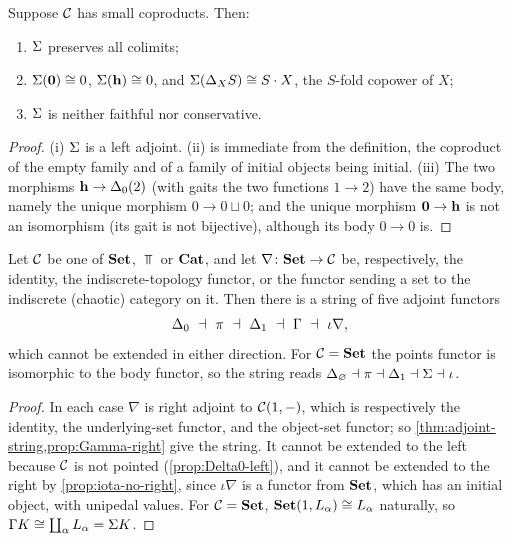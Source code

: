\begin{proposition}\label{prop:body-properties}
Suppose $\mathcal{C}$ has small coproducts. Then:
\begin{enumerate}
\item $\Sigma$ preserves all colimits;
\item $\Sigma(\mathbf{0})\cong0$, $\Sigma(\mathbf{h})\cong0$, and
  $\Sigma(\Delta_XS)\cong S\cdot X$, the $S$-fold copower of $X$;
\item $\Sigma$ is neither faithful nor conservative.
\end{enumerate}
\end{proposition}

\begin{proof}
(i) $\Sigma$ is a left adjoint. (ii) is immediate from the definition, the
coproduct of the empty family and of a family of initial objects being
initial. (iii) The two morphisms $\mathbf{h}\to\Delta_0(2)$ (with gaits the two
functions $1\to2$) have the same body, namely the unique morphism
$0\to0\sqcup0$; and the unique morphism $\mathbf{0}\to\mathbf{h}$ is not an
isomorphism (its gait is not bijective), although its body $0\to0$ is.
\end{proof}

\begin{proposition}\label{prop:set-string}
Let $\mathcal{C}$ be one of $\mathbf{Set}$, $\Top$ or $\mathbf{Cat}$, and let $\nabla\colon\mathbf{Set}\to\mathcal{C}$
be, respectively, the identity, the indiscrete-topology functor, or the
functor sending a set to the indiscrete (chaotic) category on it. Then there
is a string of five adjoint functors
\[
\Delta_0\ \dashv\ \legs\ \dashv\ \Delta_1\ \dashv\ \points\ \dashv\ \iota\nabla,
\]
which cannot be extended in either direction. For $\mathcal{C}=\mathbf{Set}$ the points functor
is isomorphic to the body functor, so the string reads
$\Delta_\varnothing\dashv\pi\dashv\Delta_1\dashv\Sigma\dashv\iota$.
\end{proposition}

\begin{proof}
In each case $\nabla$ is right adjoint to $\mathcal{C}(1,-)$, which is respectively
the identity, the underlying-set functor, and the object-set functor; so
\cref{thm:adjoint-string,prop:Gamma-right} give the string. It cannot be
extended to the left because $\mathcal{C}$ is not pointed (\cref{prop:Delta0-left}),
and it cannot be extended to the right by \cref{prop:iota-no-right}, since
$\iota\nabla$ is a functor from $\mathbf{Set}$, which has an initial object, with
unipedal values. For $\mathcal{C}=\mathbf{Set}$, $\mathbf{Set}(1,L_\alpha)\cong L_\alpha$ naturally,
so $\Gamma K\cong\coprod_\alpha L_\alpha=\Sigma K$.
\end{proof}

